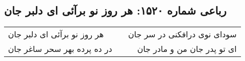 \begin{center}
\section*{رباعی شماره ۱۵۲۰: هر روز نو برآئی ای دلبر جان}
\label{sec:1520}
\begin{longtable}{l p{0.5cm} r}
هر روز نو برآئی ای دلبر جان
&&
سودای نوی درافکنی در سر جان
\\
در ده پرده بهر سحر ساغر جان
&&
ای تو پدر جان من و مادر جان
\\
\end{longtable}
\end{center}
